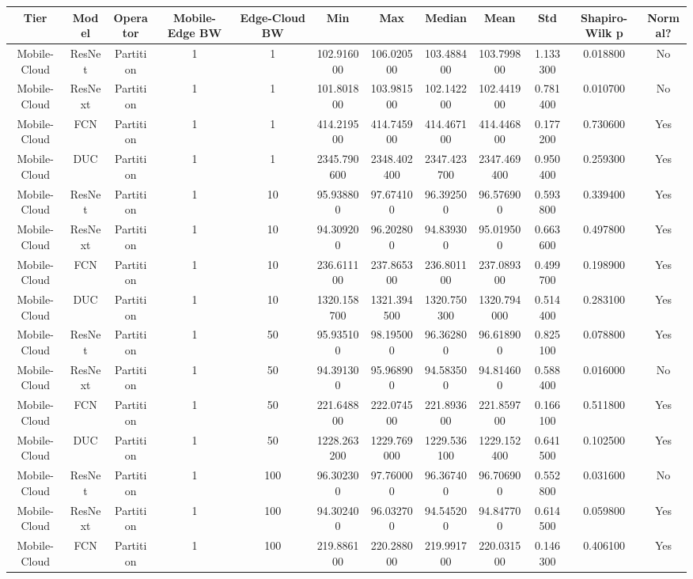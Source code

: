 \begin{tabular}{|c||c||c||c||c||c||c||c||c||c||c||c|}
\toprule
Tier & Model & Operator & Mobile-Edge BW & Edge-Cloud BW & Min & Max & Median & Mean & Std & Shapiro-Wilk p & Normal? \\
\midrule
Mobile-Cloud & ResNet & Partition & 1 & 1 & 102.916000 & 106.020500 & 103.488400 & 103.799800 & 1.133300 & 0.018800 & No \\
Mobile-Cloud & ResNext & Partition & 1 & 1 & 101.801800 & 103.981500 & 102.142200 & 102.441900 & 0.781400 & 0.010700 & No \\
Mobile-Cloud & FCN & Partition & 1 & 1 & 414.219500 & 414.745900 & 414.467100 & 414.446800 & 0.177200 & 0.730600 & Yes \\
Mobile-Cloud & DUC & Partition & 1 & 1 & 2345.790600 & 2348.402400 & 2347.423700 & 2347.469400 & 0.950400 & 0.259300 & Yes \\
Mobile-Cloud & ResNet & Partition & 1 & 10 & 95.938800 & 97.674100 & 96.392500 & 96.576900 & 0.593800 & 0.339400 & Yes \\
Mobile-Cloud & ResNext & Partition & 1 & 10 & 94.309200 & 96.202800 & 94.839300 & 95.019500 & 0.663600 & 0.497800 & Yes \\
Mobile-Cloud & FCN & Partition & 1 & 10 & 236.611100 & 237.865300 & 236.801100 & 237.089300 & 0.499700 & 0.198900 & Yes \\
Mobile-Cloud & DUC & Partition & 1 & 10 & 1320.158700 & 1321.394500 & 1320.750300 & 1320.794000 & 0.514400 & 0.283100 & Yes \\
Mobile-Cloud & ResNet & Partition & 1 & 50 & 95.935100 & 98.195000 & 96.362800 & 96.618900 & 0.825100 & 0.078800 & Yes \\
Mobile-Cloud & ResNext & Partition & 1 & 50 & 94.391300 & 95.968900 & 94.583500 & 94.814600 & 0.588400 & 0.016000 & No \\
Mobile-Cloud & FCN & Partition & 1 & 50 & 221.648800 & 222.074500 & 221.893600 & 221.859700 & 0.166100 & 0.511800 & Yes \\
Mobile-Cloud & DUC & Partition & 1 & 50 & 1228.263200 & 1229.769000 & 1229.536100 & 1229.152400 & 0.641500 & 0.102500 & Yes \\
Mobile-Cloud & ResNet & Partition & 1 & 100 & 96.302300 & 97.760000 & 96.367400 & 96.706900 & 0.552800 & 0.031600 & No \\
Mobile-Cloud & ResNext & Partition & 1 & 100 & 94.302400 & 96.032700 & 94.545200 & 94.847700 & 0.614500 & 0.059800 & Yes \\
Mobile-Cloud & FCN & Partition & 1 & 100 & 219.886100 & 220.288000 & 219.991700 & 220.031500 & 0.146300 & 0.406100 & Yes \\

\end{tabular}

